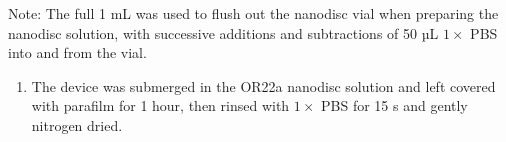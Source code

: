 \documentclass[
  a4paper,
]{scrbook}
\providecommand{\tightlist}{%
  \setlength{\itemsep}{0pt}\setlength{\parskip}{0pt}}\usepackage{longtable,booktabs,array}
\begin{document}
Note: The full 1 mL was used to flush out the nanodisc vial when
preparing the nanodisc solution, with successive additions and
subtractions of 50 µL \(1 \times\) PBS into and from the vial.

\begin{enumerate}
\def\labelenumi{\arabic{enumi}.}
\setcounter{enumi}{6}
\tightlist
\item
  The device was submerged in the OR22a nanodisc solution and left
  covered with parafilm for 1 hour, then rinsed with \(1 \times\) PBS
  for 15 s and gently nitrogen dried.
\end{enumerate}

\begin{figure}

\begin{minipage}[t]{0.03\linewidth}

{\centering 


}

\end{minipage}%
%
\begin{minipage}[t]{0.01\linewidth}

{\centering 

~

}

\end{minipage}%
%
\begin{minipage}[t]{0.45\linewidth}

{\centering 

}
\end{minipage}
\end{figure}
\end{document}
